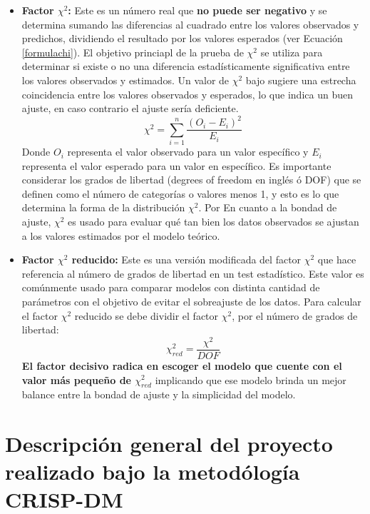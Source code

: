 \begin{itemize}
    \item \textbf{Factor $\chi^{2}$:} Este es un número real que \textbf{no puede ser negativo} y se determina sumando las diferencias al cuadrado entre los valores observados y predichos, dividiendo el resultado por los valores esperados (ver Ecuación \ref{formulachi}). El objetivo princiapl de la prueba de $\chi^{2}$ se utiliza para determinar si existe o no una diferencia estadísticamente significativa entre los valores observados y estimados. Un valor de $\chi^{2}$ bajo sugiere una estrecha coincidencia entre los valores observados y esperados, lo que indica un buen ajuste, en caso contrario el ajuste sería deficiente.
    \begin{equation}
        \chi^{2} = \sum_{i=1}^{n}\frac{\left(O_{i}-E_{i}\right)^{2}}{E_{i}} \label{formulachi}
    \end{equation}
    Donde $O_{i}$ representa el valor observado para un valor específico y $E_{i}$ representa el valor esperado para un valor en específico. Es importante considerar los grados de libertad (degrees of freedom en inglés ó DOF) que se definen como el número de categorías o valores menos 1, y esto es lo que determina la forma de la distribución $\chi^{2}$. Por En cuanto a la bondad de ajuste, $\chi^{2}$ es usado para evaluar qué tan bien los datos observados se ajustan a los valores estimados por el modelo teórico.
    \item \textbf{Factor $\chi^{2}$ reducido:} Este es una versión modificada del factor $\chi^{2}$ que hace referencia al número de grados de libertad en un test estadístico. Este valor es comúnmente usado para comparar modelos con distinta cantidad de parámetros con el objetivo de evitar el sobreajuste de los datos. Para calcular el factor $\chi^{2}$ reducido se debe dividir el factor $\chi^{2}$, por el número de grados de libertad:
    \begin{equation}
        \chi_{red}^{2} = \frac{\chi^{2}}{DOF}
    \end{equation}
    \textbf{El factor decisivo radica en escoger el modelo que cuente con el valor más pequeño de $\chi_{red}^{2}$} implicando que ese modelo brinda un mejor balance entre la bondad de ajuste y la simplicidad del modelo.
\end{itemize}

\section{Descripción general del proyecto realizado bajo la metodólogía CRISP-DM}

